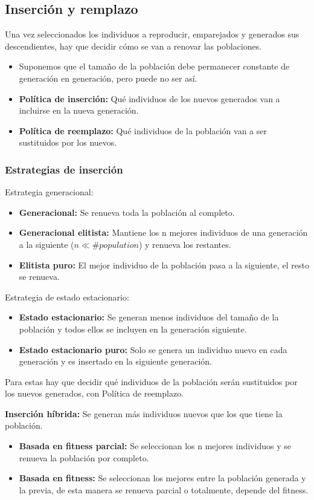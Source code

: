 \documentclass[12pt, twoside, openright]{report} %
\begin{document}
\subsection{Inserción y remplazo}
Una vez seleccionados los individuos a reproducir, emparejados y generados sus descendientes, hay que decidir cómo se van a renovar las poblaciones.
\begin{itemize}
	\item Suponemos que el tamaño de la población debe permanecer constante de generación en generación, pero puede no ser así.
	\item \textbf{Política de inserción:} Qué individuos de los nuevos generados van a incluirse en la nueva generación.
	\item \textbf{Política de reemplazo:} Qué individuos de la población van a ser sustituidos por los nuevos.
\end{itemize}

\subsubsection{Estrategias de inserción}
Estrategia generacional:
\begin{itemize}
	\item \textbf{Generacional:} Se renueva toda la población al completo.
	\item \textbf{Generacional elitista:} Mantiene los n mejores individuos de una generación a la siguiente ($n \ll \#population$) y renueva los restantes.
	\item \textbf{Elitista puro:} El mejor individuo de la población pasa a la siguiente, el resto se renueva.
\end{itemize}

Estrategia de estado estacionario:
\begin{itemize}
	\item \textbf{Estado estacionario:} Se generan menos individuos del tamaño de la población y todos ellos se incluyen en la
	      generación siguiente.
	\item \textbf{Estado estacionario puro:} Solo se genera un individuo nuevo en cada generación y es insertado en la siguiente generación.
\end{itemize}
Para estas hay que decidir qué individuos de la población serán sustituidos por los nuevos generados, con Política de reemplazo.

\textbf{Inserción híbrida:} Se generan más individuos nuevos que los que tiene la población.
\begin{itemize}
	\item \textbf{Basada en fitness parcial:} Se seleccionan los n mejores individuos y se renueva la población por completo.
	\item \textbf{Basada en fitness:} Se seleccionan los mejores entre la población generada y la previa, de esta manera se renueva parcial o totalmente, depende del fitness.
\end{itemize}
\end{document}
